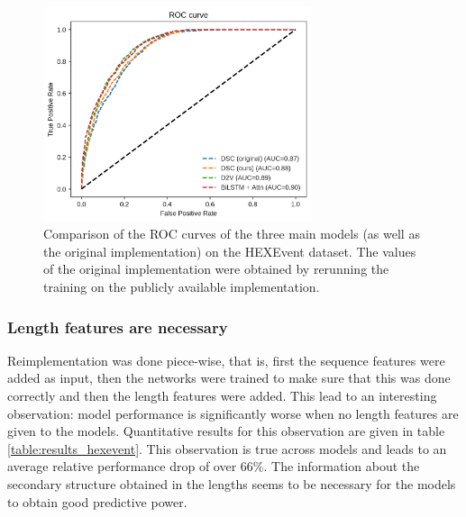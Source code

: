 \begin{figure}
	\centering\includegraphics[width=0.7\textwidth]{../visualizations/ch5-results/hexevent_cross_model_roc_auc_comparison.png} 
	\caption[bla.]{Comparison of the ROC curves of the three main models (as well as the original implementation) on the HEXEvent dataset. The values of the original implementation were obtained by rerunning the training on the publicly available implementation. }
	\label{fig:hexevent_auc}
\end{figure}






\subsubsection{Length features are necessary}
Reimplementation was done piece-wise, that is, first the sequence features were added as input, then the networks were trained to make sure that this was done correctly and then the length features were added. This lead to an interesting observation: model performance is significantly worse when no length features are given to the models. Quantitative results for this observation are given in table \ref{table:results_hexevent}. This observation is true across models and leads to an average relative performance drop of over 66\%. The information about the secondary structure obtained in the lengths seems to be necessary for the models to obtain good predictive power.


